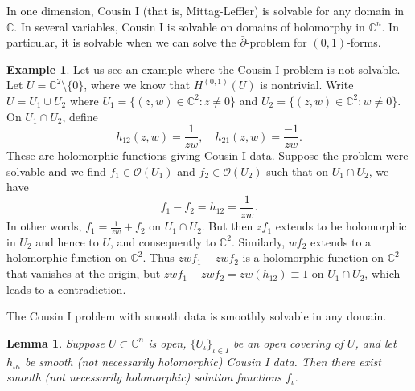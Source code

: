 \documentclass[12pt,openany]{book}
\newcommand{\C}{{\mathbb{C}}}
\newcommand{\sO}{{\mathscr{O}}}
\theoremstyle{plain}
\newtheorem{lemma}[thm]{Lemma}
\theoremstyle{remark}
\theoremstyle{definition}
\theoremstyle{exercise}
\theoremstyle{example}
\newtheorem{example}[thm]{Example}
\begin{document}
In one dimension, Cousin I (that is, Mittag-Leffler) is solvable for
any domain in $\C$.
In several variables, Cousin I is solvable on domains of holomorphy in
$\C^n$.  In particular, it is solvable when we can solve the
$\bar{\partial}$-problem for $(0,1)$-forms.

\begin{example}
Let us see an example where the Cousin I problem is not solvable.  Let $U =
\C^2 \setminus \{ 0 \}$, where we know that $H^{(0,1)}(U)$ is nontrivial.
Write $U = U_1 \cup U_2$ where
$U_1 = \{ (z,w) \in \C^2 : z \neq 0 \}$ and
$U_2 = \{ (z,w) \in \C^2 : w \neq 0 \}$.  On $U_1 \cap U_2$, define
\begin{equation*}
h_{12}(z,w) = \frac{1}{zw} , \quad
h_{21}(z,w) = \frac{-1}{zw} .
\end{equation*}
These are holomorphic functions giving Cousin I data.
Suppose the problem were solvable and we find
$f_1 \in \sO(U_1)$ and
$f_2 \in \sO(U_2)$ such that on $U_1 \cap U_2$, we have
\begin{equation*}
f_1 -f_2 = h_{12} = \frac{1}{zw} .
\end{equation*}
In other words, $f_1 = \frac{1}{zw}+f_2$ on $U_1 \cap U_2$.
But then $zf_1$ extends to be holomorphic in $U_2$ and
hence to $U$, and consequently to $\C^2$.  Similarly, $wf_2$ extends to a
holomorphic function on $\C^2$.  Thus
$zwf_1 -zwf_2$ is a holomorphic function on $\C^2$ that vanishes at the
origin, but $zwf_1 -zwf_2 = zw(h_{12}) \equiv 1$ on $U_1 \cap U_2$,
which leads to a contradiction.
\end{example}

The Cousin I problem with smooth data is smoothly solvable in any domain.

\begin{lemma}
Suppose $U \subset \C^n$ is open,
$\{ U_{\iota} \}_{\iota \in I}$ be an open covering of $U$,
and let $h_{\iota\kappa}$ be smooth (not necessarily holomorphic) Cousin I
data.  Then there exist smooth (not necessarily holomorphic) solution
functions $f_\iota$.
\end{lemma}
\end{document}
